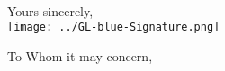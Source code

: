 \documentclass[11pt,a4paper,sans]{moderncv}        %
\begin{document}


\nocite{*}



\clearpage
\recipient{~}{~}
\date{\vspace*{-0cm}~}
\opening{\vspace*{-3cm}~}
\closing{Yours sincerely, \\ \hspace*{-0.3cm}\texttt{[image: ../GL-blue-Signature.png]} \vspace*{-1cm}}
\makelettertitle
 To Whom it may concern,
 
\end{document}
